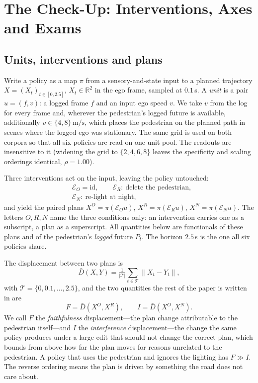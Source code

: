 \section{The Check-Up: Interventions, Axes and Exams}
\label{sec:checkup}


\subsection{Units, interventions and plans}
Write a policy as a map $\pi$ from a sensory-and-state input to a planned trajectory
$X=(X_t)_{t\in[0,2.5]}$, $X_t\in\mathbb{R}^2$ in the ego frame, sampled at $0.1$\,s. A \emph{unit} is a
pair $u=(f,v)$: a logged frame $f$ and an input ego speed $v$. We take $v$ from the log for every
frame and, wherever the pedestrian's logged future is available, additionally
$v\in\{4,8\}\,\mathrm{m/s}$, which places the pedestrian on the planned path in scenes where the logged
ego was stationary. The same grid is used on both corpora so that all six policies are read on one
unit pool. The readouts are insensitive to it (widening the grid to $\{2,4,6,8\}$ leaves the
specificity and scaling orderings identical, $\rho=1.00$).

Three interventions act on the input, leaving the policy untouched:
\begin{equation}
\begin{aligned}
&\mathcal{E}_O=\mathrm{id},\qquad \mathcal{E}_R:\ \text{delete the pedestrian},\\
&\mathcal{E}_N:\ \text{re-light at night},
\end{aligned}
\label{eq:interventions}
\end{equation}
and yield the paired plans $X^{O}=\pi(\mathcal{E}_O u)$, $X^{R}=\pi(\mathcal{E}_R u)$,
$X^{N}=\pi(\mathcal{E}_N u)$. The letters $O,R,N$ name the three conditions only: an intervention carries one as a subscript, a plan as a superscript. All quantities below are functionals of
these plans and of the
pedestrian's \emph{logged} future $P_t$. The horizon $2.5$\,s is the one all six policies share.

The displacement between two plans is
\begin{equation}
\bar D(X,Y)=\tfrac{1}{|\mathcal{T}|}\textstyle\sum_{t\in\mathcal{T}}\|X_t-Y_t\|,
\label{eq:disp}
\end{equation}
with $\mathcal{T}=\{0,0.1,\dots,2.5\}$, and the two quantities the rest of the paper is written in are
\begin{equation}
F=\bar D(X^{O},X^{R}),\qquad I=\bar D(X^{O},X^{N}).
\label{eq:FI}
\end{equation}
We call $F$ the \emph{faithfulness} displacement---the plan change attributable to the pedestrian
itself---and $I$ the \emph{interference} displacement---the change the same policy produces under a large edit that should not change the correct plan, which bounds from above how far the plan moves for reasons unrelated to the pedestrian. A policy that
uses the pedestrian and ignores the lighting has $F\gg I$. The reverse ordering means the plan is
driven by something the road does not care about.

